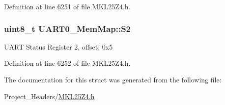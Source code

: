 Definition at line 6251 of file M\+K\+L25\+Z4.\+h.

\subsubsection[{\texorpdfstring{S2}{S2}}]{\setlength{\rightskip}{0pt plus 5cm}uint8\+\_\+t U\+A\+R\+T0\+\_\+\+Mem\+Map\+::\+S2}\hypertarget{struct_u_a_r_t0___mem_map_ab34f7b8ed424a024a723effca847f5ec}{}\label{struct_u_a_r_t0___mem_map_ab34f7b8ed424a024a723effca847f5ec}
U\+A\+RT Status Register 2, offset\+: 0x5 

Definition at line 6252 of file M\+K\+L25\+Z4.\+h.



The documentation for this struct was generated from the following file\+:\begin{DoxyCompactItemize}
\item 
Project\+\_\+\+Headers/\hyperlink{_m_k_l25_z4_8h}{M\+K\+L25\+Z4.\+h}\end{DoxyCompactItemize}

